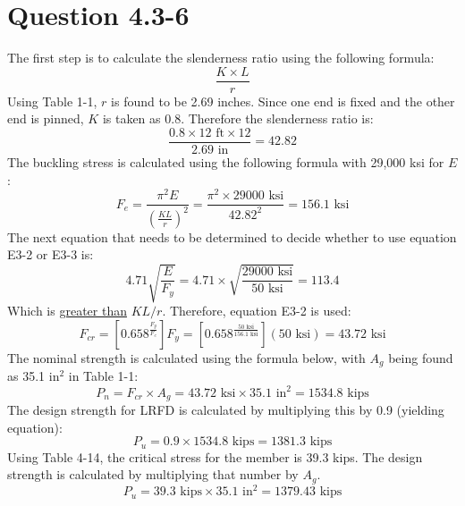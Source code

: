\documentclass{article}
\begin{document}
\section*{Question 4.3-6}
The first step is to calculate the slenderness ratio using the following formula: 
\[\frac{K\times L}{r}\]
Using Table 1-1, $r$ is found to be 2.69 inches. Since one end is fixed and the other end is pinned, $K$ is taken as 0.8. Therefore the slenderness ratio is: 
\[\frac{0.8\times 12\text{ ft}\times 12}{2.69\text{ in}}=42.82\]
The buckling stress is calculated using the following formula with 29,000 ksi for $E$: 
\[F_e=\frac{\pi^2E}{\left(\frac{KL}{r}\right)^2}=\frac{\pi^2\times29000\text{ ksi}}{42.82^2}=156.1\text{ ksi}\]
The next equation that needs to be determined to decide whether to use equation E3-2 or E3-3 is: 
\[4.71\sqrt{\frac{E}{F_y}}=4.71\times\sqrt{\frac{29000\text{ ksi}}{50\text{ ksi}}}=113.4\] 
Which is \underline{greater than} $KL/r$. Therefore, equation E3-2 is used: 
\[F_{cr}=\left[0.658^{\frac{F_y}{F_e}}\right]F_y=\left[0.658^{\frac{50\text{ ksi}}{156.1\text{ ksi}}}\right](50\text{ ksi})=43.72\text{ ksi}\]
The nominal strength is calculated using the formula below, with $A_g$ being found as 35.1 $\text{in}^2$ in Table 1-1: 
\[P_n=F_{cr}\times A_g=43.72\text{ ksi}\times 35.1\text{ in}^2=1534.8\text{ kips}\] 
The design strength for LRFD is calculated by multiplying this by 0.9 (yielding equation): 
\[P_u=0.9\times1534.8\text{ kips}=\boxed{1381.3\text{ kips}}\]
Using Table 4-14, the critical stress for the member is 39.3 kips. The design strength is calculated by multiplying that number by $A_g$. 
\[P_u=39.3\text{ kips}\times 35.1\text{ in}^2=\boxed{1379.43\text{ kips}}\]
\newpage
\end{document}

